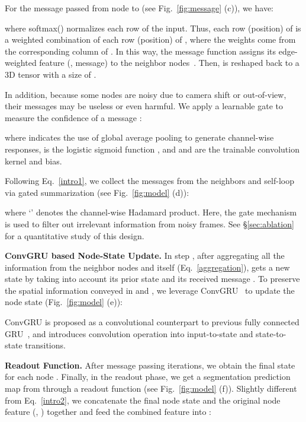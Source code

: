 \documentclass[10pt,twocolumn,letterpaper]{article}
\begin{document}
For the message  passed from node  to  (see Fig.~\ref{fig:message} (c)), we have:
	\vspace*{-2pt}

where softmax() normalizes each row of the input. Thus, each row (position) of  is a weighted combination of each row (position) of , where the weights come from the corresponding column of .   In this way, the message function  assigns its edge-weighted feature (\ie, message) to the neighbor nodes~\cite{velickovic2017graph}. Then,  is reshaped back to a 3D tensor with a size of .

In addition, because some nodes are noisy due to camera shift or out-of-view, their messages may be useless or even harmful. We apply a learnable gate  to measure the confidence of a message :
	\vspace*{-2pt}

where  indicates the use of global average pooling to generate channel-wise responses,  is the logistic sigmoid function , and  and  are the trainable convolution kernel and bias.





Following Eq.~\ref{intro1}, we collect the messages from the neighbors and self-loop via gated summarization (see Fig.~\ref{fig:model} (d)):
	\vspace*{-7pt}

where `' denotes the channel-wise Hadamard product. Here, the gate mechanism is used to filter out irrelevant information from noisy frames. See \S\ref{sec:ablation} for a quantitative study of this design.






\noindent\textbf{ConvGRU based Node-State Update.}
In step , after aggregating all the information from the neighbor nodes and itself (Eq.~\ref{aggregation}),  gets a new state  by taking into account its prior state  and its received message . To preserve the spatial information conveyed in  and , we leverage ConvGRU~\cite{ballas2015delving} to update the node state (Fig.~\ref{fig:model} (e)):
	\vspace*{-6pt}

ConvGRU is proposed as a convolutional counterpart to previous fully connected
GRU~\cite{cho2014learning}, and introduces convolution operation into input-to-state
and state-to-state transitions.


\noindent\textbf{Readout Function.}
After  message passing iterations, we obtain the final state  for each node .
Finally, in the readout phase, we get a segmentation prediction map  from  through a readout function   (see Fig.~\ref{fig:model} (f)). Slightly different from Eq.~\ref{intro2}, we concatenate the final node state  and the original node feature  (\ie, ) together and feed the combined feature into :
	\vspace*{-4pt}
\end{document}
